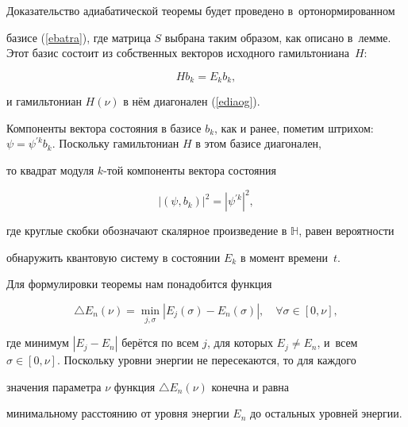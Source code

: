 \smallskip



Доказательство адиабатической теоремы будет проведено в~ортонормированном

базисе (\ref{ebatra}), где матрица $S$ выбрана таким образом, как описано в~лемме. Этот базис состоит из собственных векторов исходного гамильтониана~$H$:

\begin{equation*}

  Hb_k=E_kb_k,

\end{equation*}

и гамильтониан $H(\nu)$ в нём диагонален (\ref{ediaog}). 

Компоненты вектора состояния в базисе $b_k$, как и ранее, пометим штрихом: $\psi=\psi^{\prime k}b_k$. Поскольку гамильтониан $H$ в этом базисе диагонален,

то квадрат модуля $k$-той компоненты вектора состояния

\begin{equation*}

  |(\psi,b_k)|^2=|\psi^{\prime k}|^2,

\end{equation*}

где круглые скобки обозначают скалярное произведение в $\mathbb H$, равен вероятности

обнаружить квантовую систему в состоянии $E_k$ в момент времени~$t$.



Для формулировки теоремы нам понадобится функция

\begin{equation*}

  \triangle E_n(\nu)=\underset{j,\sigma }{\min}|E_j(\sigma )-E_n(\sigma )|,\quad 

  \forall\sigma \in[0,\nu],

\end{equation*}

где минимум $|E_j-E_n|$ берётся по всем $j$, для которых $E_j\ne E_n$, и~всем $\sigma \in[0,\nu]$. Поскольку уровни энергии не пересекаются, то для каждого

значения параметра $\nu$ функция $\triangle E_n(\nu)$ конечна и равна

минимальному расстоянию от уровня энергии $E_n$ до остальных уровней энергии.



